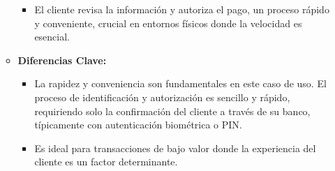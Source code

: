 \begin{enumerate}
\begin{itemize}
\begin{itemize}
            \item El cliente revisa la información y autoriza el pago, un proceso rápido y conveniente, crucial en entornos físicos donde la velocidad es esencial.
        \end{itemize}
        \item \textbf{Diferencias Clave:}
        \begin{itemize}
            \item La rapidez y conveniencia son fundamentales en este caso de uso. El proceso de identificación y autorización es sencillo y rápido, requiriendo solo la confirmación del cliente a través de su banco, típicamente con autenticación biométrica o PIN.
            \item Es ideal para transacciones de bajo valor donde la experiencia del cliente es un factor determinante.
        \end{itemize}
    \end{itemize}


\end{enumerate}
